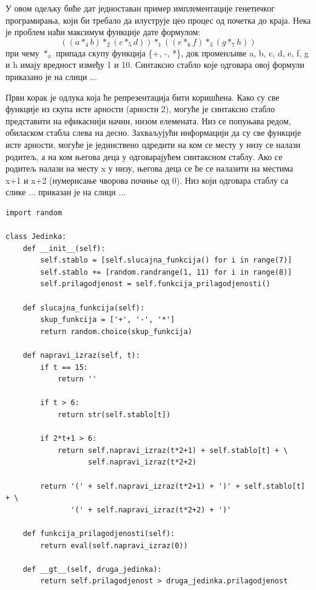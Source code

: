 \documentclass[a4paper]{article}
\begin{document}
У овом одељку биће дат једноставан пример имплементације генетичког програмирања, који би требало да илуструје цео процес од почетка до краја. Нека је проблем наћи максимум функције дате формулом:
\begin{equation} 
    ((a *_4 b) *_2 (c *_5 d)) *_1 ((e *_6 f) *_3 (g *_7 h))
\end{equation}
при чему $*_x$ припада скупу функција \{+, -, *\}, док променљиве a, b, c, d, e, f, g и h имају вредност између 1 и 10. Синтаксно стабло које одговара овој формули приказано је на слици ... \newline

Први корак је одлука која ће репрезентација бити коришћена. Како су све функције из скупа исте арности (арности 2), могуће је синтаксно стабло представити на ефикаснији начин, низом елемената. Низ се попуњава редом,  обиласком стабла слева на десно. Захваљујући информацији да су све функције исте арности, могуће је јединствено одредити на ком се месту у низу се налази родитељ, а на ком његова деца у одговарајућем синтаксном стаблу. Ако се родитељ налази на месту x у низу, његова деца се ће се налазити на местима x+1 и x+2 (нумерисање чворова почиње од 0). Низ који одговара стаблу са слике ... приказан је на слици ...

\begin{lstlisting}[caption={Primer ubacivanja koda u tekst},frame=single, label=simple]
import random

class Jedinka:
    def __init__(self):
        self.stablo = [self.slucajna_funkcija() for i in range(7)]
        self.stablo += [random.randrange(1, 11) for i in range(8)]
        self.prilagodjenost = self.funkcija_prilagodjenosti()

    def slucajna_funkcija(self):
        skup_funkcija = ['+', '-', '*']
        return random.choice(skup_funkcija)

    def napravi_izraz(self, t):
        if t == 15:
            return ''

        if t > 6:
            return str(self.stablo[t])

        if 2*t+1 > 6:
            return self.napravi_izraz(t*2+1) + self.stablo[t] + \
                   self.napravi_izraz(t*2+2)

        return '(' + self.napravi_izraz(t*2+1) + ')' + self.stablo[t] + \
               '(' + self.napravi_izraz(t*2+2) + ')'

    def funkcija_prilagodjenosti(self):
        return eval(self.napravi_izraz(0))

    def __gt__(self, druga_jedinka):
        return self.prilagodjenost > druga_jedinka.prilagodjenost
\end{lstlisting}
\end{document}
